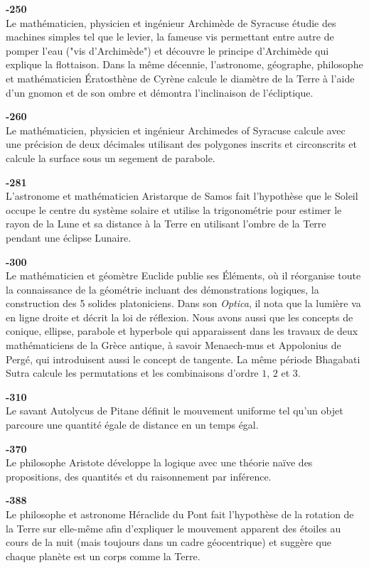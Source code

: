 \textbf{-250}\\
Le mathématicien, physicien et ingénieur Archimède de Syracuse étudie des machines simples tel que le levier, la fameuse vis permettant entre autre de pomper l'eau ("vis d'Archimède") et découvre le principe d'Archimède qui explique la flottaison. Dans la même décennie, l'astronome, géographe, philosophe et mathématicien Ératosthène de Cyrène calcule le diamètre de la Terre à l'aide d'un gnomon et de son ombre et démontra l'inclinaison de l'écliptique.

\textbf{-260}\\
Le mathématicien, physicien et ingénieur Archimedes of Syracuse calcule  avec une précision de deux décimales utilisant des polygones inscrits et circonscrits et calcule la surface sous un segement de parabole.

\textbf{-281}\\
L'astronome et mathématicien Aristarque de Samos fait l'hypothèse que le Soleil occupe le centre du système solaire et utilise la trigonométrie pour estimer le rayon de la Lune et sa distance à la Terre en utilisant l'ombre de la Terre pendant une éclipse Lunaire.

\textbf{-300}\\
Le mathématicien et géomètre Euclide publie ses Éléments, où il réorganise toute la connaissance de la géométrie incluant des démonstrations logiques, la construction des 5 solides platoniciens. Dans son \textit{Optica}, il nota que la lumière va en ligne droite et décrit la loi de réflexion. Nous avons aussi que les concepts de conique, ellipse, parabole et hyperbole qui apparaissent dans les travaux de deux mathématiciens de la Grèce antique, à savoir Menaech-mus et Appolonius de Pergé, qui introduisent aussi le concept de tangente. La même période Bhagabati Sutra calcule les permutations et les combinaisons d'ordre $1$, $2$ et $3$.

\textbf{-310}\\
Le savant Autolycus de Pitane définit le mouvement uniforme tel qu'un objet parcoure une quantité égale de distance en un temps égal.

\textbf{-370}\\
Le philosophe Aristote développe la logique avec une théorie naïve des propositions, des quantités et du raisonnement par inférence.

\textbf{-388}\\
Le philosophe et astronome Héraclide du Pont fait l'hypothèse de la rotation de la Terre sur elle-même afin d'expliquer le mouvement apparent des étoiles au cours de la nuit (mais toujours dans un cadre géocentrique) et suggère que chaque planète est un corps comme la Terre.

